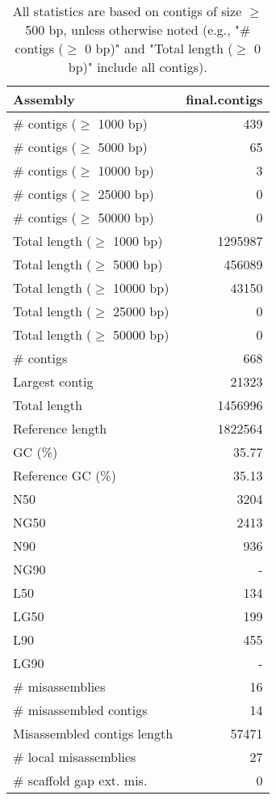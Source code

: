\documentclass[12pt,a4paper]{article}
\begin{document}
\begin{table}[ht]
\begin{center}
\caption{All statistics are based on contigs of size $\geq$ 500 bp, unless otherwise noted (e.g., "\# contigs ($\geq$ 0 bp)" and "Total length ($\geq$ 0 bp)" include all contigs).}
\begin{tabular}{|l*{1}{|r}|}
\hline
Assembly & final.contigs \\ \hline
\# contigs ($\geq$ 1000 bp) & 439 \\ \hline
\# contigs ($\geq$ 5000 bp) & 65 \\ \hline
\# contigs ($\geq$ 10000 bp) & 3 \\ \hline
\# contigs ($\geq$ 25000 bp) & 0 \\ \hline
\# contigs ($\geq$ 50000 bp) & 0 \\ \hline
Total length ($\geq$ 1000 bp) & 1295987 \\ \hline
Total length ($\geq$ 5000 bp) & 456089 \\ \hline
Total length ($\geq$ 10000 bp) & 43150 \\ \hline
Total length ($\geq$ 25000 bp) & 0 \\ \hline
Total length ($\geq$ 50000 bp) & 0 \\ \hline
\# contigs & 668 \\ \hline
Largest contig & 21323 \\ \hline
Total length & 1456996 \\ \hline
Reference length & 1822564 \\ \hline
GC (\%) & 35.77 \\ \hline
Reference GC (\%) & 35.13 \\ \hline
N50 & 3204 \\ \hline
NG50 & 2413 \\ \hline
N90 & 936 \\ \hline
NG90 & - \\ \hline
L50 & 134 \\ \hline
LG50 & 199 \\ \hline
L90 & 455 \\ \hline
LG90 & - \\ \hline
\# misassemblies & 16 \\ \hline
\# misassembled contigs & 14 \\ \hline
Misassembled contigs length & 57471 \\ \hline
\# local misassemblies & 27 \\ \hline
\# scaffold gap ext. mis. & 0 \\ \hline

\end{tabular}
\end{center}
\end{table}
\end{document}
